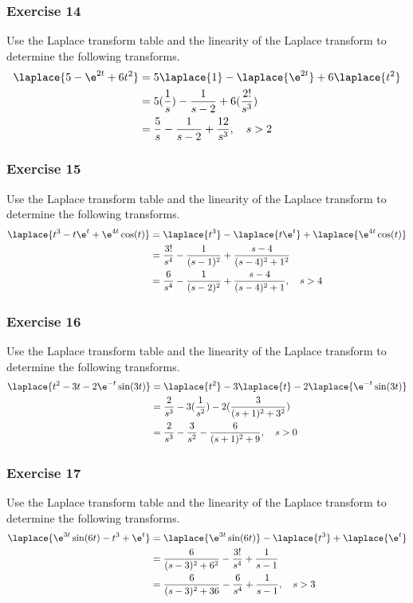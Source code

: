 \documentclass{math}
\begin{document}
\subsubsection*{Exercise 14}
Use the Laplace transform table and the linearity of the Laplace transform to
determine the following transforms.
\begin{align*}
  \laplace{5-\e^{2t}+6t^2} &= 5\laplace{1}-\laplace{\e^{2t}}+6\laplace{t^2} \\
  &= 5(\frac{1}{s})-\frac{1}{s-2}+6(\frac{2!}{s^3}) \\
  &= \frac{5}{s}-\frac{1}{s-2}+\frac{12}{s^3}, \quad s>2
\end{align*}

\subsubsection*{Exercise 15}
Use the Laplace transform table and the linearity of the Laplace transform to
determine the following transforms.
\begin{align*}
  \laplace{t^3-t\e^t+\e^{4t}\cos(t)} &= \laplace{t^3}-\laplace{t\e^t}+
    \laplace{\e^{4t}\cos(t)} \\
  &= \frac{3!}{s^4}-\frac{1}{(s-1)^2}+\frac{s-4}{(s-4)^2+1^2} \\
  &= \frac{6}{s^4}-\frac{1}{(s-2)^2}+\frac{s-4}{(s-4)^2+1}, \quad s>4
\end{align*}

\subsubsection*{Exercise 16}
Use the Laplace transform table and the linearity of the Laplace transform to
determine the following transforms.
\begin{align*}
  \laplace{t^2-3t-2\e^{-t}\sin(3t)} &=
    \laplace{t^2}-3\laplace{t}-2\laplace{\e^{-t}\sin(3t)} \\
  &= \frac{2}{s^3}-3(\frac{1}{s^2})-2(\frac{3}{(s+1)^2+3^2}) \\
  &= \frac{2}{s^3}-\frac{3}{s^2}-\frac{6}{(s+1)^2+9}, \quad s>0
\end{align*}

\subsubsection*{Exercise 17}
Use the Laplace transform table and the linearity of the Laplace transform to
determine the following transforms.
\begin{align*}
  \laplace{\e^{3t}\sin(6t)-t^3+\e^t} &= \laplace{\e^{3t}\sin(6t)}-
    \laplace{t^3}+\laplace{\e^t} \\
  &= \frac{6}{(s-3)^2+6^2}-\frac{3!}{s^4}+\frac{1}{s-1} \\
  &= \frac{6}{(s-3)^2+36}-\frac{6}{s^4}+\frac{1}{s-1}, \quad s>3
\end{align*}
\end{document}
